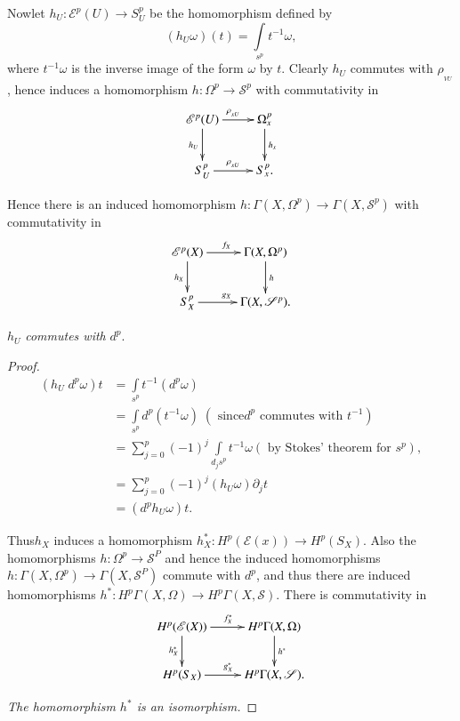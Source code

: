 Now\pageoriginale let  $ h_U : \mathscr{E}^p (U)  \rightarrow  S^p_U $
be the homomorphism defined by  
$$
( h_U \omega ) (t)  = \int\limits_{s^p} t^{-1} \omega ,  
$$
where $ t^{-1} \omega$  is  the inverse image of the form $\omega$ 
by $t$. Clearly $h_U $ commutes with $ \rho_{_{VU}} $, hence induces a
homomorphism $ h : \Omega^p \rightarrow  \mathscr{S}^p $ with
commutativity in  
\[
\xymatrix{
\mathscr{E}^p(U) \ar[r]^{\rho_{_{xU}}} \ar[d]_{h_U} & \Omega^p_x
\ar[d]^{h_x}\\
S^p_U \ar[r]^{\rho_{_{xU}}} & S^p_x.
}
\]

Hence there is an induced homomorphism $ h : \Gamma ( X, \Omega^p )
\rightarrow \Gamma ( X, \mathscr{S}^p ) $ with commutativity in  
\[
\xymatrix{
\mathscr{E}^p(X) \ar[r]^{f_X} \ar[d]_{h_X} & \Gamma(X,\Omega^p)
\ar[d]^h\\
S^p_X \ar[r]^{g_X} & \Gamma(X,\mathscr{S}^p).
}
\]

$h_U$ \textit{commutes with} $d^p$.

\begin{proof}
\begin{align*}
( h_U \; d^p \omega ) t &=  \int\limits_{s^p} t^{-1} ( d^p \omega )\\ 
&=  \int\limits_{s^p} d^p  ( t^{-1} \omega ) \; ( \text{ since}  d^p
  \text{ commutes with } t^{-1}) \\ 
&= \sum^p_{j=0} (-1)^j \int\limits_{d_js^p} t^{-1}  \omega (\text{ by
    Stokes' theorem for } s^p ), \\ 
&= \sum^p_{j=0} (-1)^j ( h_U \omega ) \partial_j t \\ 
&= (d^p h_U \omega ) t.
\end{align*}

Thus\pageoriginale $h_X$ induces a homomorphism $ h^*_X : H^p (
\mathscr{E} (x)) \rightarrow H^p (S_X) $. Also the homomorphisms $ h : \Omega^p
\rightarrow \mathscr{S}^P$ and hence the induced homomorphisms $h :
\Gamma (X, \Omega^p) \rightarrow \Gamma ( X, \mathscr{S}^P ) $ commute
with $d^p $, and thus there are induced homomorphisms $ h^* : H^p
\Gamma ( X, \Omega  ) \rightarrow H^p  \Gamma ( X, \mathscr{S} )
$. There is commutativity in  
\[
\xymatrix{
H^p(\mathscr{E}(X))\ar[r]^{f^{\ast}_X} \ar[d]_{h^{\ast}_X} &
H^p\Gamma(X,\Omega)\ar[d]^{h^{\ast}}\\
H^p(S_X) \ar[r]^{g^{\ast}_X} & H^p\Gamma (X,\mathscr{S}).
}
\]

\textit{The homomorphism $h^*$ is an isomorphism.}
\end{proof}

